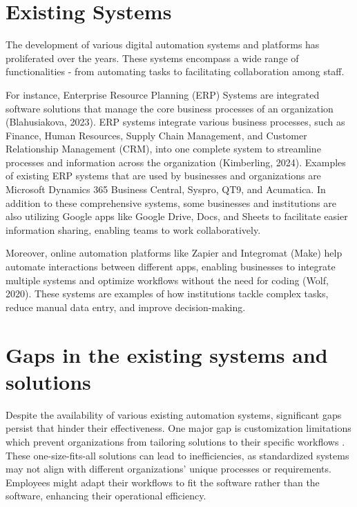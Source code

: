 \section{Existing Systems}

The development of various digital automation systems and platforms has proliferated over the years. These systems encompass a wide range of functionalities - from automating tasks to facilitating collaboration among staff.

For instance, Enterprise Resource Planning (ERP) Systems are integrated software solutions that manage the core business processes of an organization (Blahusiakova, 2023). ERP systems integrate various business processes, such as Finance, Human Resources, Supply Chain Management, and Customer Relationship Management (CRM), into one complete system to streamline processes and information across the organization (Kimberling, 2024). Examples of existing ERP systems that are used by businesses and organizations are Microsoft Dynamics 365 Business Central, Syspro, QT9, and Acumatica. In addition to these comprehensive systems, some businesses and institutions are also utilizing Google apps like Google Drive, Docs, and Sheets to facilitate easier information sharing, enabling teams to work collaboratively. 
 
Moreover, online automation platforms like Zapier and Integromat (Make) help automate interactions between different apps, enabling businesses to integrate multiple systems and optimize workflows without the need for coding (Wolf, 2020). These systems are examples of how institutions tackle complex tasks, reduce manual data entry, and improve decision-making.

\section{Gaps in the  existing systems and solutions}

Despite the availability of various existing automation systems, significant gaps persist that hinder their effectiveness. One major gap is customization limitations which prevent organizations from tailoring solutions to their specific workflows \cite{aleixo2010}. These one-size-fits-all solutions can lead to inefficiencies, as standardized systems may not align with different organizations' unique processes or requirements. Employees might adapt their workflows to fit the software rather than the software, enhancing their operational efficiency. 


